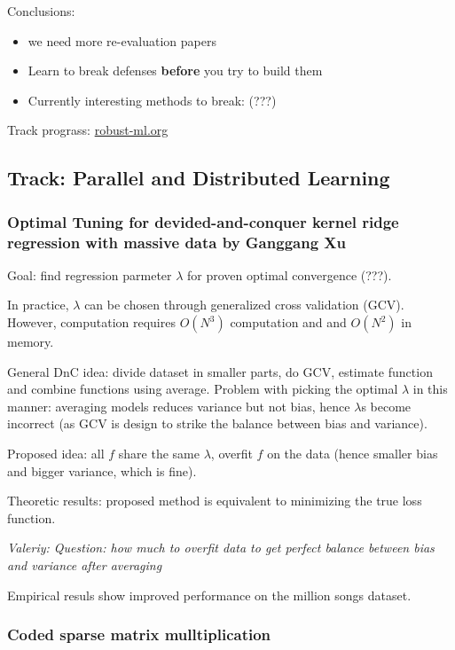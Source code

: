 \documentclass[11pt,oneside,a4paper]{scrartcl}
\newcommand{\valeriy}[1]{{\color{blue}\textit{Valeriy: #1}}}
\begin{document}
Conclusions:
\begin{itemize}
\item we need more re-evaluation papers
\item Learn to break defenses \textbf{before} you try to build them
\item Currently interesting methods to break: (???)
\end{itemize}

Track prograss: \url{robust-ml.org}

\subsection{Track: Parallel and Distributed Learning}
\label{sec:track:-parall-distr}



\subsubsection{Optimal Tuning for devided-and-conquer kernel ridge
  regression with massive data by Ganggang Xu \cite{xu18f}}
\label{sec:optim-tuing-devid}

Goal: find regression parmeter $\lambda$ for proven optimal
convergence (???).

In practice, $\lambda$ can be chosen through generalized cross
validation (GCV). However, computation requires $O(N^3)$ computation
and and $O(N^2)$ in memory.

General DnC idea: divide dataset in smaller parts, do GCV, estimate function and
combine functions using average. Problem with picking the optimal
$\lambda$ in this manner: averaging models reduces variance but not
bias, hence $\lambda$s become incorrect (as GCV is design to strike
the balance between bias and variance).

Proposed idea: all $f$ share the same $\lambda$, overfit $f$ on the
data (hence smaller bias and bigger variance, which is fine).

Theoretic results: proposed method is equivalent to minimizing the
true loss function.

\valeriy{Question: how much to overfit data to get perfect balance
  between bias and variance after averaging}

Empirical resuls show improved performance on the million songs dataset.



\subsubsection{Coded sparse matrix mulltiplication \cite{wang18e}}
\label{sec:coded-sparse-matrix}
\end{document}
